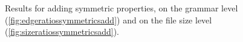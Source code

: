 \begin{figure}[h]
	\centering
	\hfill 
	\caption{Results for adding symmetric properties, on the grammar level (\ref{fig:edgeratiossymmetricsadd}) and on the file size level (\ref{fig:sizeratiossymmetricsadd}).}
	\label{fig:symmetricAddResults}
\end{figure}

